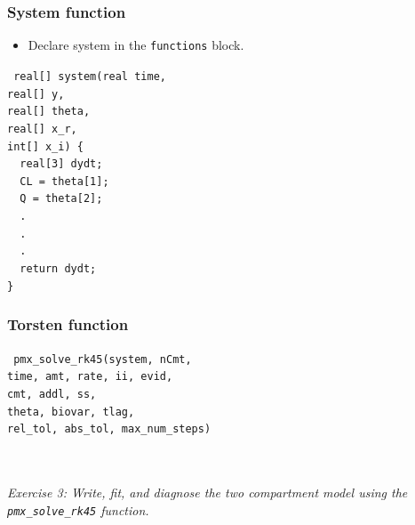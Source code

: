 \documentclass[xcolor=table]{beamer}
\begin{document}
\begin{frame}
  \frametitle{System function}
  
  \begin{itemize}
    \item Declare system in the \texttt{functions} block.
  \end{itemize}
  
  \texttt{
    real[] system(real time, \\
    \hspace{2.8cm} real[] y, \\
    \hspace{2.8cm} real[] theta, \\
    \hspace{2.8cm} real[] x\_r, \\
    \hspace{2.8cm} int[] x\_i) \{ \\
    \ \ real[3] dydt; \\
    \ \ CL = theta[1]; \\
    \ \ Q = theta[2]; \\
    \ \ . \\ \ \ . \\ \ \ . \\
    \ \ return dydt; \\ \}
  }

\end{frame}

\begin{frame}
  \frametitle{Torsten function}
  
    \texttt{
  pmx\_solve\_rk45(system, nCmt, \\
  \hspace{2.9cm} time, amt, rate, ii, evid, \\ 
  \hspace{2.9cm} cmt, addl, ss, \\
  \hspace{2.9cm} theta, biovar, tlag, \\
  \hspace{2.9cm} rel\_tol, abs\_tol, max\_num\_steps)
  }

  \ \\ \ \\
  \textit{\textcolor{MRGGreen}{Exercise 3}: Write, fit, and diagnose the two compartment
  model using the \texttt{pmx\_solve\_rk45} function.}

\end{frame}
\end{document}
